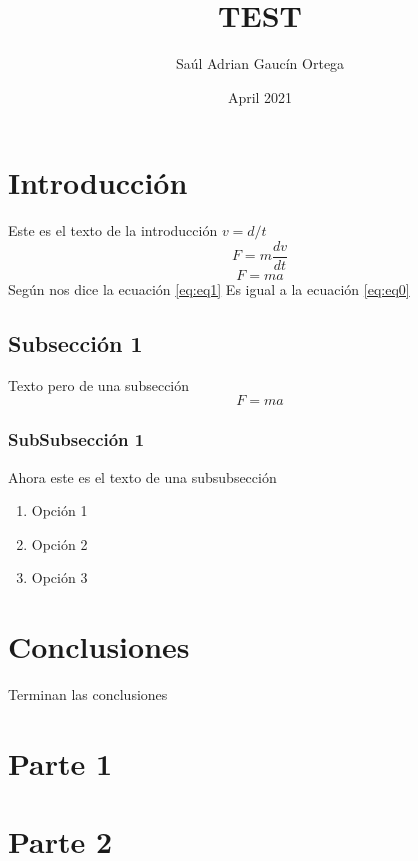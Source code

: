 \documentclass[]{article}
\title{TEST}
\author{Saúl Adrian Gaucín Ortega}
\date{April 2021}
\begin{document}
\maketitle

\section{Introducción}
Este es el texto de la introducción $v=d/t$
\begin{equation}
    F=m\frac{dv}{dt}
    \label{eq:eq0}
\end{equation}
\begin{equation}
    F=ma
    \label{eq:eq1}
\end{equation}
Según nos dice la ecuación \ref{eq:eq1} Es igual a la ecuación \ref{eq:eq0}
\subsection{Subsección 1}
Texto pero de una subsección \[F=ma\]

\subsubsection{SubSubsección 1}
Ahora este es el texto de una subsubsección

\begin{enumerate}
    \item Opción 1
    \item Opción 2
    \item Opción 3
\end{enumerate}

\section{Conclusiones}
Terminan las conclusiones


\section{Parte 1}
\section{Parte 2}
\end{document}
